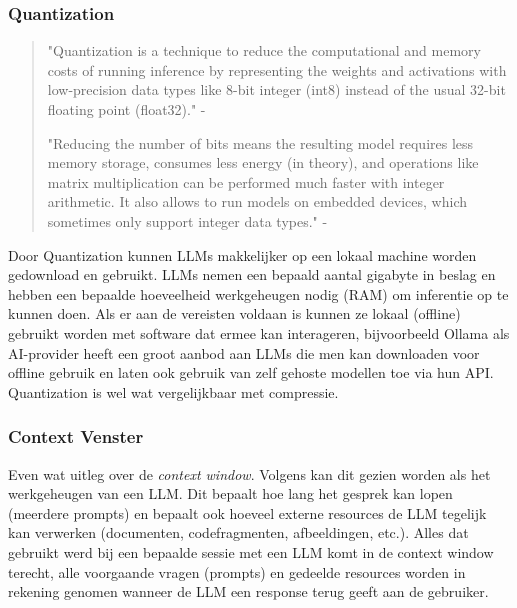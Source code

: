 \subsubsection{Quantization}
\label{sssec:quantization}

\begin{quote}
    "Quantization is a technique to reduce the computational and memory costs of running inference by representing the weights and activations with low-precision data types like 8-bit integer (int8) instead of the usual 32-bit floating point (float32)." - \autocite{HuggingFace}
    
    "Reducing the number of bits means the resulting model requires less memory storage, consumes less energy (in theory), and operations like matrix multiplication can be performed much faster with integer arithmetic. It also allows to run models on embedded devices, which sometimes only support integer data types." - \autocite{HuggingFace}
\end{quote}


Door Quantization kunnen LLMs makkelijker op een lokaal machine worden gedownload en gebruikt. LLMs nemen een bepaald aantal gigabyte in beslag en hebben een bepaalde hoeveelheid werkgeheugen nodig (RAM) om inferentie op te kunnen doen. Als er aan de vereisten voldaan is kunnen ze lokaal (offline) gebruikt worden met software dat ermee kan interageren, bijvoorbeeld Ollama als AI-provider heeft een groot aanbod aan LLMs die men kan downloaden voor offline gebruik en laten ook gebruik van zelf gehoste modellen toe via hun API. Quantization is wel wat vergelijkbaar met compressie.




\subsubsection{Context Venster}
\label{sssec:contextvenster}
Even wat uitleg over de \textit{context window}. Volgens \textcite{Bergmann} kan dit gezien worden als het werkgeheugen van een LLM. Dit bepaalt hoe lang het gesprek kan lopen (meerdere prompts) en bepaalt ook hoeveel externe resources de LLM tegelijk kan verwerken (documenten, codefragmenten, afbeeldingen, etc.).
Alles dat gebruikt werd bij een bepaalde sessie met een LLM komt in de context window terecht, alle voorgaande vragen (prompts) en gedeelde resources worden in rekening genomen wanneer de LLM een response terug geeft aan de gebruiker.
\autocite{Bergmann} \\

